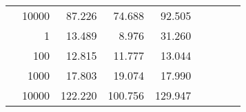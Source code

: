 \begin{table}
\begin{tabular}{rrrrrrrrr}
	            
					 &  
					 
					\multirow{ 1 }{*}{ 10000 } &
					
						
							    
							    
	                           87.226 & 74.688 & 92.505  \\
	                
	            
	        
				\noalign{\smallskip}\hline
				\multirow{ 4 }{*}{ 2000000 } &
				
					
					 
					\multirow{ 1 }{*}{ 1 } &
					
						
							    
							    
	                           13.489 & 8.976 & 31.260  \\
	                
	            
					 &  
					 
					\multirow{ 1 }{*}{ 100 } &
					
						
							    
							    
	                           12.815 & 11.777 & 13.044  \\
	                
	            
					 &  
					 
					\multirow{ 1 }{*}{ 1000 } &
					
						
							    
							    
	                           17.803 & 19.074 & 17.990  \\
	                
	            
					 &  
					 
					\multirow{ 1 }{*}{ 10000 } &
					
						
							    
							    
	                           122.220 & 100.756 & 129.947  \\
	                
	            
	        

\hline

\end{tabular}
\end{table}
\clearpage


	    

